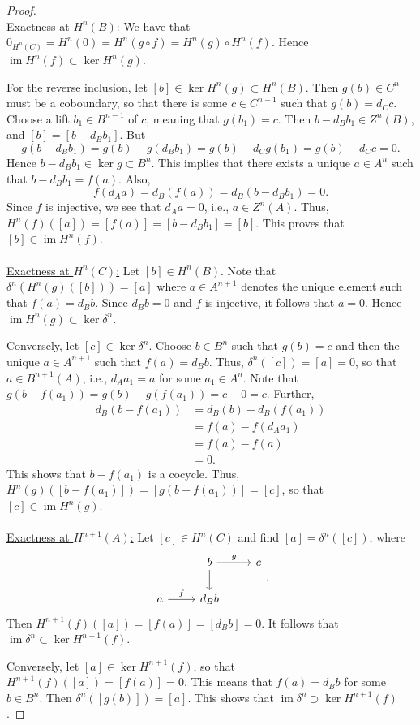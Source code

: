 \documentclass[10pt,letterpaper,cm]{nupset}
\theoremstyle{definition}
\newcommand{\1}{\mathbf{1}}
\newcommand{\0}{\vec 0}
\DeclareMathOperator{\im}{im}
\begin{document}
\begin{proof} $ $\\
\underline{Exactness at $H^n(B)$:}
We have that $0_{H^n(C)} = H^n(0) = H^n(g \circ f) = H^n(g) \circ H^n(f)$. Hence $\im{H^n(f)} \subset \ker{H^n(g)}$.

For the reverse inclusion, let $[b] \in \ker{H^n(g)} \subset H^n(B)$. Then $g(b) \in C^n$ must be a coboundary, so that there is some $c\in C^{n-1}$ such that $g(b) = d_C{c}$. Choose a lift $b_1 \in B^{n-1}$ of $c$, meaning that $g(b_1) = c$. Then $b -  d_B{b_1} \in Z^n(B)$, and $[b] = [b - d_B{b_1}]$. But $$g(b - d_B{b_1}) = g(b) - g(d_B{b_1}) = g(b) - d_C{g(b_1)} = g(b) - d_C{c} =0.$$ Hence $b - d_B{b_1} \in \ker{g} \subset B^n$. This implies that there exists a unique $a \in A^n$ such that $b- d_B{b_1} = f(a)$. Also, $$   f(d_A{a}) = d_B(f(a)) = d_B(b-d_B{b_1}) = 0   .$$ Since $f$ is injective, we see that $d_A{a} =0$, i.e., $a \in Z^n(A)$. Thus, $H^n(f)([a]) = [f(a)] = [b-d_B{b_1}] = [b]$. This proves that $[b] \in \im{H^n(f)}$.
\\ \\
\underline{Exactness at $H^n(C)$:} Let $[b] \in H^n(B)$. Note that $\delta^n(H^n(g)([b])) = [a]$ where $a\in A^{n+1}$ denotes the unique element such that $f(a) = d_B{b} $. Since $d_B{b} =0$ and $f$ is injective, it follows that $a=0$. Hence $\im{H^n(g)}\subset \ker{\delta^n}$.  

Conversely, let $[c] \in \ker{\delta^n}$. Choose $b\in B^n$ such that $g(b) =c$ and then the unique $a\in A^{n+1}$ such that $f(a) = d_B{b}$. Thus, $\delta^n([c]) =[a] =0$, so that $a\in B^{n+1}(A)$, i.e., $d_A{a_1} =a$ for some $a_1 \in A^n$. Note that $g(b-f(a_1))= g(b) -g(f(a_1)) = c -0 =c$. Further, 
\begin{align*}
d_B(b-f(a_1)) & = d_B(b) - d_B(f(a_1))
\\ & = f(a) - f(d_A{a_1})
\\ & = f(a) - f(a)
\\ & =0.
\end{align*} 
This shows that $b-f(a_1)$ is a cocycle. Thus, $H^n(g)([b-f(a_1)]) = [g(b- f(a_1))] = [c]$, so that $[c] \in \im{H^n(g)}$. 
\\ \\
\underline{Exactness at $H^{n+1}(A)$:} Let $[c] \in H^n(C)$ and find $[a] = \delta^n([c])$, where
\[
\begin{tikzcd}
                 & b \arrow[d] \arrow[r, "g"] & c \\
a \arrow[r, "f"] & d_B{b}                     &  
\end{tikzcd}
.\] 
Then $H^{n+1}(f)([a]) = [f(a)] = [d_B{b}] =0$. It follows that $\im{\delta^n} \subset \ker{H^{n+1}(f)}$.

Conversely, let $[a] \in  \ker{H^{n+1}(f)}$, so that $H^{n+1}(f)([a]) = [f(a)]= 0$. This means that $f(a) = d_B{b}$ for some $b \in B^n$. Then $\delta^n([g(b)]) = [a]$. This shows that $\im{\delta^n} \supset \ker{H^{n+1}(f)}$.
\end{proof}
\end{document}
